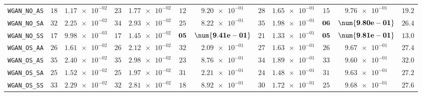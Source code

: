 \begin{xltabular}{\textwidth}{l||cC|cC|cC|cC|cC||c}
	\texttt{WGAN\_NO\_AS} & $ 18$ & $ \num{1.17e-02}$ & $ 23$ & $ \num{1.77e-02}$ & $ 12$ & $ \num{9.20e-01}$ & $ 28$ & $ \num{1.65e-01}$ & $ 15$ & $ \num{9.76e-01}$ & $ 19.2$  \\
	\texttt{WGAN\_NO\_SA} & $ 32$ & $ \num{2.25e-02}$ & $ 34$ & $ \num{2.93e-02}$ & $ 25$ & $ \num{8.22e-01}$ & $ 35$ & $ \num{1.98e-01}$ & $\bf 06$ & $\bf \num{9.80e-01}$ & $ 26.4$  \\
	\texttt{WGAN\_NO\_SS} & $ 17$ & $ \num{9.98e-03}$ & $ 17$ & $ \num{1.45e-02}$ & $\bf 05$ & $\bf \num{9.41e-01}$ & $ 21$ & $ \num{1.33e-01}$ & $\bf 05$ & $\bf \num{9.81e-01}$ & $ 13.0$  \\
	\texttt{WGAN\_OS\_AA} & $ 26$ & $ \num{1.61e-02}$ & $ 26$ & $ \num{2.12e-02}$ & $ 32$ & $ \num{2.09e-01}$ & $ 27$ & $ \num{1.63e-01}$ & $ 26$ & $ \num{9.67e-01}$ & $ 27.4$  \\
	\texttt{WGAN\_OS\_AS} & $ 35$ & $ \num{2.40e-02}$ & $ 35$ & $ \num{2.98e-02}$ & $ 23$ & $ \num{8.76e-01}$ & $ 34$ & $ \num{1.89e-01}$ & $ 33$ & $ \num{9.60e-01}$ & $ 32.0$  \\
	\texttt{WGAN\_OS\_SA} & $ 25$ & $ \num{1.52e-02}$ & $ 25$ & $ \num{1.97e-02}$ & $ 31$ & $ \num{2.21e-01}$ & $ 24$ & $ \num{1.48e-01}$ & $ 31$ & $ \num{9.63e-01}$ & $ 27.2$  \\
	\texttt{WGAN\_OS\_SS} & $ 33$ & $ \num{2.29e-02}$ & $ 32$ & $ \num{2.81e-02}$ & $ 18$ & $ \num{8.92e-01}$ & $ 30$ & $ \num{1.72e-01}$ & $ 25$ & $ \num{9.68e-01}$ & $ 27.6$  \\

\end{xltabular}
